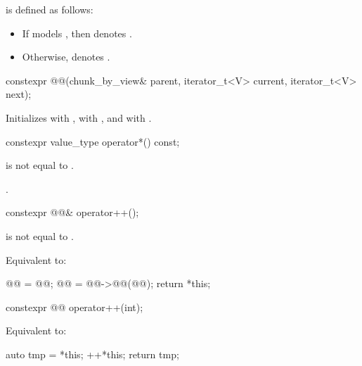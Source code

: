 \pnum
{} is defined as follows:
\begin{itemize}
\item
If  models ,
then  denotes .
\item
Otherwise,  denotes .
\end{itemize}

\begin{itemdecl}
constexpr @@(chunk_by_view& parent, iterator_t<V> current, iterator_t<V> next);
\end{itemdecl}

\begin{itemdescr}
\pnum
\effects
Initializes  with ,
 with , and
 with .
\end{itemdescr}

\begin{itemdecl}
constexpr value_type operator*() const;
\end{itemdecl}

\begin{itemdescr}
\pnum
\expects
{} is not equal to .

\pnum
\returns
{}.
\end{itemdescr}

\begin{itemdecl}
constexpr @@& operator++();
\end{itemdecl}

\begin{itemdescr}
\pnum
\expects
{} is not equal to .

\pnum
\effects
Equivalent to:
\begin{codeblock}
@@ = @@;
@@ = @@->@@(@@);
return *this;
\end{codeblock}
\end{itemdescr}

\begin{itemdecl}
constexpr @@ operator++(int);
\end{itemdecl}

\begin{itemdescr}
\pnum
\effects
Equivalent to:
\begin{codeblock}
auto tmp = *this;
++*this;
return tmp;
\end{codeblock}
\end{itemdescr}

